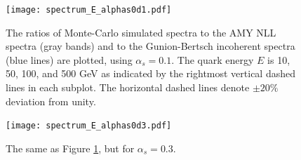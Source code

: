 \documentclass[aps, prc, reprint, amsmath, groupedaddress, nofootinbib]{revtex4-1}
\begin{document}
{\begin{appendices}
\begin{figure}
\texttt{[image: spectrum\_E\_alphas0d1.pdf]}
\caption{The ratios of Monte-Carlo simulated spectra to the AMY NLL spectra (gray bands) and to the Gunion-Bertsch incoherent spectra (blue lines) are plotted, using $\alpha_s = 0.1$. The quark energy $E$ is 10, 50, 100, and 500 GeV as indicated by the rightmost vertical dashed lines in each subplot. The horizontal dashed lines denote $\pm 20\%$ deviation from unity.}
\label{fig:spectra-alphas=0.1}
\end{figure}


\begin{figure}
\texttt{[image: spectrum\_E\_alphas0d3.pdf]}
\caption{The same as Figure \ref{fig:spectra-alphas=0.1}, but for $\alpha_s = 0.3$.}
\label{fig:spectra-alphas=0.3}
\end{figure}


\end{appendices}}
\end{document}
